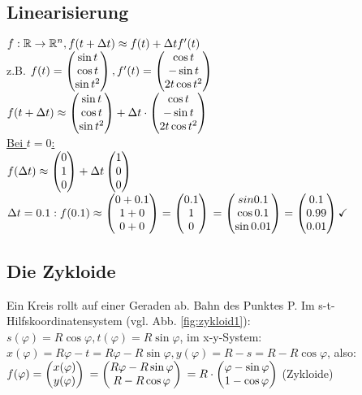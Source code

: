 \renewcommand{\ldate}{2015-10-22}

\subsection{Linearisierung}
$f:\mathbb{R} \rightarrow \mathbb{R}^n, f(t+\Delta t )\approx f(t) + \Delta t f'(t) $\\
z.B. $ f(t)=  \begin{pmatrix} \sin t\\ \cos t\\ \sin t^2 \end{pmatrix} , f'(t)= \begin{pmatrix} \cos t\\-\sin t\\2 t \cos t^2 \end{pmatrix} $\\
$f(t+\Delta t) \approx  \begin{pmatrix} \sin t\\ \cos t\\ \sin t^2 \end{pmatrix}  + \Delta t \cdot  \begin{pmatrix} \cos t\\-\sin t\\2 t \cos t^2 \end{pmatrix} $\\
\underline{Bei $t=0$:}\\
$f(\Delta t) \approx  \begin{pmatrix} 0\\1\\0 \end{pmatrix}  + \Delta t  \begin{pmatrix} 1\\0\\0 \end{pmatrix} $\\
$\Delta t=0.1: f(0.1)\approx  \begin{pmatrix} 0+0.1\\1+0\\0+0 \end{pmatrix} = \begin{pmatrix} 0.1\\1\\0 \end{pmatrix} $
$=  \begin{pmatrix} sin 0.1\\ \cos 0.1\\ \sin 0.01 \end{pmatrix}  =  \begin{pmatrix} 0.1\\ 0.99\\ 0.01 \end{pmatrix}  \checkmark $

\subsection{Die Zykloide}
\label{sec:die_zykloide}
Ein Kreis rollt auf einer Geraden ab. Bahn des Punktes P. Im s-t-Hilfskoordinatensystem (vgl. Abb. \ref{fig:zykloid1}): 
$s(\varphi) = R \cos \varphi, t(\varphi) = R \sin \varphi$, im x-y-System: 
$x(\varphi) = R \varphi - t = R\varphi - R \sin \varphi, y(\varphi)=R-s = R-R \cos \varphi$, also: \\
$f(\varphi) =  \begin{pmatrix} x(\varphi)\\y(\varphi) \end{pmatrix} $
$=  \begin{pmatrix} R\varphi - R \sin \varphi\\R-R \cos \varphi \end{pmatrix} $
$=R\cdot  \begin{pmatrix} \varphi - \sin \varphi\\1-\cos \varphi \end{pmatrix} $ (Zykloide)

